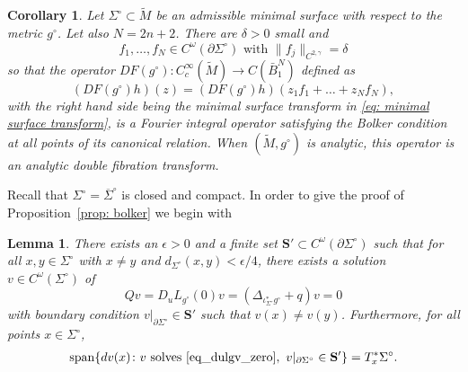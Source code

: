 \documentclass[11pt]{amsart}
\newtheorem{Lemma}[Theorem]{Lemma}
\newtheorem{Corollary}[Theorem]{Corollary}
\theoremstyle{definition}
\numberwithin{equation}{section}
\newcommand{\ol}[1]{\overline{#1}}
\newcommand{\p}{\partial}
\newcommand{\SSS}{\mathbf S}
\begin{document}
\begin{Corollary}\label{cor: bolker}
Let $\Sigma^\circ\subset \widetilde{M}$ be an admissible minimal surface with respect to the metric $g^\circ$. Let also $N = 2n+2$. There are $\delta>0$ small 
and
\[
f_1,\dots, f_{N}\in C^\omega(\partial\Sigma^\circ) \text{ with } \|f_j\|_{C^{2,\gamma}}  = \delta
\]
so that the operator $DF(g^\circ) : C^\infty_c(\widetilde{M}) \to C(\bar B_1^N)$ defined as%
\[
(DF(g^\circ) h)(z) = (DF(g^\circ) h)(z_1 f_1+\dots + z_{N} f_{N}),
\]
with the right hand side being the minimal surface transform in \eqref{eq: minimal surface transform}, is a Fourier integral operator satisfying the Bolker condition at all points of its canonical relation. When $(\widetilde{M},g^\circ)$ is analytic, this operator is an analytic double fibration transform.
\end{Corollary}
Recall that $\Sigma^\circ = \ol{\Sigma}^\circ$ is closed and compact. In order to give the proof of Proposition~\ref{prop: bolker} we begin with 
\begin{Lemma}\label{lem: diagonal separation}
There exists an $\epsilon>0$ and a finite set $\SSS'\subset C^\omega(\p \Sigma^\circ)$ such that for all $x, y \in \Sigma^\circ$ with $x\neq y$ and $d_{\Sigma^\circ}(x,y) < \epsilon /4$, there exists a solution $v\in C^\omega(\Sigma^\circ)$ of 
\begin{equation} \label{eq_dulgv_zero}
Qv = D_uL_{g^\circ}(0)v=(\Delta_{\iota^\ast_{\Sigma^\circ}g^\circ}+q)v=0
\end{equation}
with boundary condition $v\vert_{\partial \Sigma^\circ} \in \SSS'$ such that $v(x) \neq v(y)$. Furthermore, for all points $x\in\Sigma^\circ$, 
\begin{eqnarray}\label{eq: full span}
{\rm span}\{dv(x) \colon v\ 
\text{{\rm solves} \eqref{eq_dulgv_zero}},\ 
v\vert_{\partial \Sigma^\circ} \in \SSS'\} = T^*_x\Sigma^\circ.
\end{eqnarray}
\end{Lemma}
\end{document}
